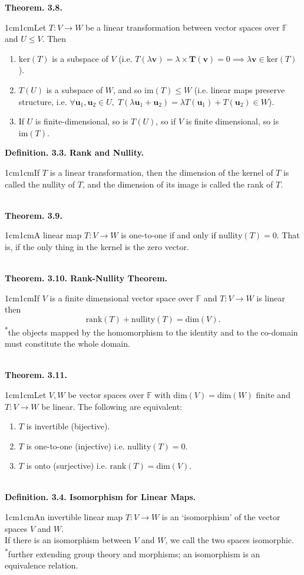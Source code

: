 \documentclass{article}
\newcommand{\vect}[1]{\mathbf{#1}}
\newcommand{\definition}[2]{\textbf{Definition. #1.}\begin{adjustwidth}{1cm}{1cm}#2\end{adjustwidth}}
\newcommand{\theorem}[2]{\textbf{Theorem. #1.}\begin{adjustwidth}{1cm}{1cm}#2\end{adjustwidth}}
\begin{document}
\theorem{3.8}{Let $T : V \rightarrow W$ be a linear transformation between vector spaces over $\mathbb{F}$ and $U \leq V$. Then \begin{enumerate}
  \item $\text{ker}(T)$ is a subspace of $V$ (i.e. $T(\lambda \vect{v}) = \lambda \times \vect T(\vect{v}) = 0 \implies \lambda \vect{v} \in \text{ker}(T)$).
  \item $T(U)$ is a subspace of $W$, and so $\text{im}(T) \leq W$ (i.e. linear maps preserve structure, i.e. $\forall \vect{u}_1, \vect{u}_2 \in U, \; T(\lambda \vect{u}_1 + \vect{u}_2) = \lambda T(\vect{u}_1) + T(\vect{u}_2) \in W$).
  \item If $U$ is finite-dimensional, so is $T(U)$, so if $V$ is finite dimensional, so is $\text{im}(T)$.
\end{enumerate}}\newpage
\definition{3.3. Rank and Nullity}{If $T$ is a linear transformation, then the dimension of the kernel of $T$ is called the nullity of $T$, and the dimension of its image is called the rank of $T$.}~\\
\theorem{3.9}{A linear map $T: V \rightarrow W$ is one-to-one if and only if $\text{nullity}(T) = 0$. That is, if the only thing in the kernel is the zero vector.}~\\
\theorem{3.10. Rank-Nullity Theorem}{If $V$ is a finite dimensional vector space over $\mathbb{F}$ and $T : V \rightarrow W$ is linear then \[ \text{rank}(T) + \text{nullity}(T) = \text{dim}(V).\]\textsuperscript{*}the objects mapped by the homomorphism to the identity and to the co-domain must constitute the whole domain.}~\\
\theorem{3.11}{Let $V, W$ be vector spaces over $\mathbb{F}$ with $\text{dim}(V) = \text{dim}(W)$ finite and $T:V \rightarrow W$ be linear. The following are equivalent: \begin{enumerate} \item $T$ is invertible (bijective). \item $T$ is one-to-one (injective) i.e. $\text{nullity}(T) = 0$. \item $T$ is onto (surjective) i.e. $\text{rank}(T) = \text{dim}(V)$.\end{enumerate}}~\\
\definition{3.4. Isomorphism for Linear Maps}{An invertible linear map $T: V \rightarrow W$ is an `isomorphism' of the vector spaces $V$ and $W$.\\If there is an isomorphism between $V$ and $W$, we call the two spaces isomorphic.\\[1\baselineskip]\textsuperscript{*}further extending group theory and morphisms; an isomorphism is an equivalence relation.}~\\
\end{document}
